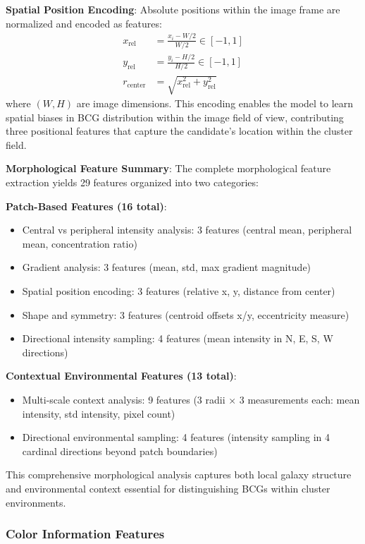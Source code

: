 \documentclass[twocolumn,10pt]{aastex631}
\begin{document}
\textbf{Spatial Position Encoding}: Absolute positions within the image frame are normalized and encoded as features:
\begin{align}
x_{\text{rel}} &= \frac{x_i - W/2}{W/2} \in [-1, 1] \\
y_{\text{rel}} &= \frac{y_i - H/2}{H/2} \in [-1, 1] \\
r_{\text{center}} &= \sqrt{x_{\text{rel}}^2 + y_{\text{rel}}^2}
\end{align}
where $(W, H)$ are image dimensions. This encoding enables the model to learn spatial biases in BCG distribution within the image field of view, contributing three positional features that capture the candidate's location within the cluster field.

\textbf{Morphological Feature Summary}: The complete morphological feature extraction yields 29 features organized into two categories:

\textbf{Patch-Based Features (16 total)}:
\begin{itemize}
\item Central vs peripheral intensity analysis: 3 features (central mean, peripheral mean, concentration ratio)
\item Gradient analysis: 3 features (mean, std, max gradient magnitude)
\item Spatial position encoding: 3 features (relative x, y, distance from center)
\item Shape and symmetry: 3 features (centroid offsets x/y, eccentricity measure)
\item Directional intensity sampling: 4 features (mean intensity in N, E, S, W directions)
\end{itemize}

\textbf{Contextual Environmental Features (13 total)}:
\begin{itemize}
\item Multi-scale context analysis: 9 features (3 radii × 3 measurements each: mean intensity, std intensity, pixel count)
\item Directional environmental sampling: 4 features (intensity sampling in 4 cardinal directions beyond patch boundaries)
\end{itemize}

This comprehensive morphological analysis captures both local galaxy structure and environmental context essential for distinguishing BCGs within cluster environments.

\subsubsection{Color Information Features}
\end{document}
